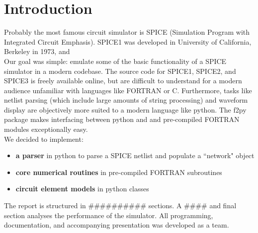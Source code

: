 \section{Introduction}
Probably the most famous circuit simulator is SPICE (Simulation Program with Integrated Circuit Emphasis). SPICE1 was developed in University of California, Berkeley in 1973, and \\

Our goal was simple: emulate some of the basic functionality of a SPICE simulator in a modern codebase. The source code for SPICE1, SPICE2, and SPICE3 is freely available online, but are difficult to understand for a modern audience unfamiliar with languages like FORTRAN or C. Furthermore, tasks like netlist parsing (which include large amounts of string processing) and waveform display are objectively more suited to a modern language like python. The f2py package makes interfacing between python and and pre-compiled FORTRAN modules exceptionally easy.\\

We decided to implement:
\begin{itemize}
    \item \textbf{a parser} in python to parse a SPICE netlist and populate a ``network" object
    \item \textbf{core numerical routines} in pre-compiled FORTRAN subroutines
    \item \textbf{circuit element models} in python classes
\end{itemize}

The report is structured in ########## sections. A #### and final section analyses the performance of the simulator. All programming, documentation, and accompanying presentation was developed as a team.